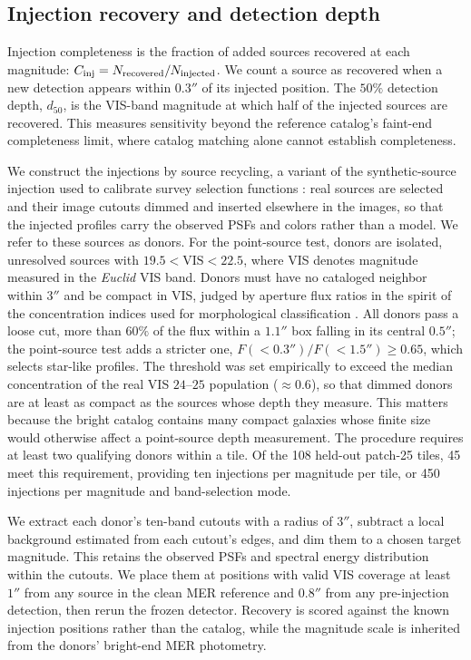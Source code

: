 \documentclass[twocolumn,linenumbers]{aastex701}
\begin{document}
\subsection{Injection recovery and detection depth}

Injection completeness is the fraction of added sources recovered at each magnitude: $C_{\rm inj}=N_{\rm recovered}/N_{\rm injected}$. We count a source as recovered when a new detection appears within $0.3''$ of its injected position. The $50\%$ detection depth, $d_{50}$, is the VIS-band magnitude at which half of the injected sources are recovered. This measures sensitivity beyond the reference catalog's faint-end completeness limit, where catalog matching alone cannot establish completeness.

We construct the injections by source recycling, a variant of the synthetic-source injection used to calibrate survey selection functions \citep[e.g., Balrog and SynPipe;][]{Suchyta2016, Everett2022, Huang2018}: real sources are selected and their image cutouts dimmed and inserted elsewhere in the images, so that the injected profiles carry the observed PSFs and colors rather than a model. We refer to these sources as donors. For the point-source test, donors are isolated, unresolved sources with $19.5<\mathrm{VIS}<22.5$, where VIS denotes magnitude measured in the \textit{Euclid} VIS band. Donors must have no cataloged neighbor within $3''$ and be compact in VIS, judged by aperture flux ratios in the spirit of the concentration indices used for morphological classification \citep{Abraham1994, Conselice2003}. All donors pass a loose cut, more than $60\%$ of the flux within a $1.1''$ box falling in its central $0.5''$; the point-source test adds a stricter one, $F(<0.3'')/F(<1.5'')\geq0.65$, which selects star-like profiles. The threshold was set empirically to exceed the median concentration of the real VIS $24$--$25$ population (${\approx}0.6$), so that dimmed donors are at least as compact as the sources whose depth they measure. This matters because the bright catalog contains many compact galaxies whose finite size would otherwise affect a point-source depth measurement. The procedure requires at least two qualifying donors within a tile. Of the 108 held-out patch-25 tiles, 45 meet this requirement, providing ten injections per magnitude per tile, or 450 injections per magnitude and band-selection mode.

We extract each donor's ten-band cutouts with a radius of $3''$, subtract a local background estimated from each cutout's edges, and dim them to a chosen target magnitude. This retains the observed PSFs and spectral energy distribution within the cutouts. We place them at positions with valid VIS coverage at least $1''$ from any source in the clean MER reference and $0.8''$ from any pre-injection detection, then rerun the frozen detector. Recovery is scored against the known injection positions rather than the catalog, while the magnitude scale is inherited from the donors' bright-end MER photometry.
\end{document}
